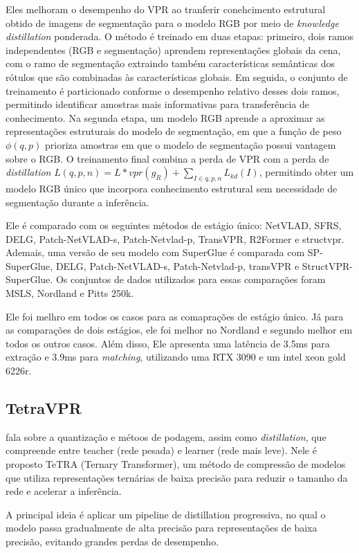 \documentclass[letterpaper, 10 pt, conference]{ieeeconf}  %
\begin{document}
Eles melhoram o desempenho do VPR ao tranferir conehcimento estrutural obtido de imagens de segmentação para o modelo RGB por meio de \textit{knowledge distillation} ponderada. O método é treinado em duas etapas: primeiro, dois ramos independentes (RGB e segmentação) aprendem representações globais da cena, com o ramo de segmentação extraindo também características semânticas dos rótulos que são combinadas às características globais. Em seguida, o conjunto de treinamento é particionado conforme o desempenho relativo desses dois ramos, permitindo identificar amostras mais informativas para transferência de conhecimento. Na segunda etapa, um modelo RGB aprende a aproximar as representações estruturais do modelo de segmentação, em que a função de peso $\phi(q,p)$ prioriza amostras em que o modelo de segmentação possui vantagem sobre o RGB. O treinamento final combina a perda de VPR com a perda de \textit{distillation} $L(q,p,n)=L*{vpr}(g_R)+\sum_{I\in{q,p,n}}L_{kd}(I)$, permitindo obter um modelo RGB único que incorpora conhecimento estrutural sem necessidade de segmentação durante a inferência.

Ele é comparado com os seguintes métodos de estágio único: NetVLAD, SFRS, DELG, Patch-NetVLAD-s, Patch-Netvlad-p, TransVPR, R2Former e structvpr. Ademais, uma versão de seu modelo com SuperGlue é comparada com SP-SuperGlue, DELG, Patch-NetVLAD-s, Patch-Netvlad-p, transVPR e StructVPR-SuperGlue. Os conjuntos de dados utilizados para essas comparações foram MSLS, Nordland e Pitts 250k.

Ele foi melhro em todos os casos para as comaprações de estágio único. Já para as comparações de dois estágios, ele foi melhor no Nordland e segundo melhor em todos os outros casos. Além disso, Ele apresenta uma latência de 3.5ms para extração e 3.9ms para \textit{matching}, utilizando uma RTX 3090 e um intel xeon gold 6226r.

\subsection{TetraVPR}
\cite{tetravpr} fala sobre a quantização e métoos de podagem, assim como \textit{distillation}, que compreende entre teacher (rede pesada) e learner (rede mais leve). Nele é proposto TeTRA (Ternary Transformer), um método de compressão de modelos que utiliza representações ternárias de baixa precisão para reduzir o tamanho da rede e acelerar a inferência.

A principal ideia é aplicar um pipeline de distillation progressiva, no qual o modelo passa gradualmente de alta precisão para representações de baixa precisão, evitando grandes perdas de desempenho.
\end{document}

